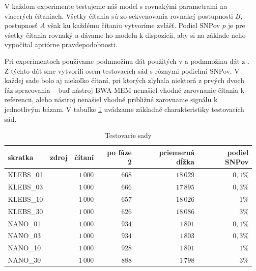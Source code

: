 V každom experimente testujeme náš model s rovnakými parametrami na viacerých čítaniach. Všetky čítania
sú zo sekvenovania rovnakej postupnosti $B$, postupnosť $A$ však ku každému čítaniu vytvoríme zvlášť.
Podiel SNPov $p$ je pre všetky čítania rovnaký a dávame ho modelu k dispozícii, aby si na základe
neho vypočítal apriórne pravdepodobnosti.

Pri experimentoch používame podmnožinu dát použitých v \cite{BasecallerComparison} a podmnožinu dát z \cite{DataRondelez}.
Z týchto dát sme vytvorili osem testovacích sád s rôznymi podielmi SNPov. V každej sade bolo aj niekoľko čítaní, pri ktorých
zlyhala niektorá z prvých dvoch fáz spracovania -- buď nástroj BWA-MEM nenašiel vhodné zarovnanie čítania k referencii, alebo
nástroj \resquiggle{} nenašiel vhodné približné zarovnanie signálu k jednotlivým bázam. V tabuľke \ref{tab:datasety} uvádzame
základné charakteristiky testovacích sád.

\begin{table}[t]
\centering
\caption{Testovacie sady}
\label{tab:datasety}
\begin{tabular}{llrrrr}
\hline
skratka   & zdroj           &  čítaní & po fáze 2 & priemerná dĺžka & podiel SNPov \\ \hline
KLEBS\_01 & \cite{BasecallerComparison} & $1\,000$         & $668$                    & $18\,029$                   & $0,1 \%$     \\
KLEBS\_03 & \cite{BasecallerComparison} & $1\,000$         & $666$                    & $17\,895$                   & $0,3 \%$     \\
KLEBS\_10 & \cite{BasecallerComparison} & $1\,000$         & $657$                    & $18\,026$                   & $1 \%$       \\
KLEBS\_30 & \cite{BasecallerComparison} & $1\,000$         & $626$                    & $18\,086$                   & $3 \%$       \\
NANO\_01  & \cite{DataRondelez}         & $1\,000$         & $934$                    & $1\,801$                    & $0,1 \%$     \\
NANO\_03  & \cite{DataRondelez}         & $1\,000$         & $934$                    & $1\,803$                    & $0,3 \%$     \\
NANO\_10  & \cite{DataRondelez}         & $1\,000$         & $928$                    & $1\,801$                    & $1 \%$       \\
NANO\_30  & \cite{DataRondelez}         & $1\,000$         & $888$                    & $1\,798$                    & $3 \%$       \\ \hline
\end{tabular}
\end{table}

